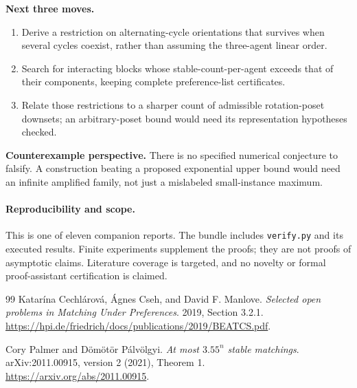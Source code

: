 \documentclass[11pt,a4paper]{article}
\theoremstyle{definition}
\theoremstyle{remark}
\begin{document}
\textbf{Next three moves.}
\begin{enumerate}[nosep]
\item Derive a restriction on alternating-cycle orientations that survives when
several cycles coexist, rather than assuming the three-agent linear order.
\item Search for interacting blocks whose stable-count-per-agent exceeds that
of their components, keeping complete preference-list certificates.
\item Relate those restrictions to a sharper count of admissible rotation-poset
downsets; an arbitrary-poset bound would need its representation hypotheses checked.
\end{enumerate}
\textbf{Counterexample perspective.} There is no specified numerical conjecture to
falsify. A construction beating a proposed exponential upper bound would need
an infinite amplified family, not just a mislabeled small-instance maximum.

\paragraph{Reproducibility and scope.} This is one of eleven companion reports. The bundle includes \texttt{verify.py} and its executed results. Finite experiments supplement the proofs; they are not proofs of asymptotic claims. Literature coverage is targeted, and no novelty or formal proof-assistant certification is claimed.

\begin{thebibliography}{99}
\small
{}
Katar\'ina Cechl\'arov\'a, \'Agnes Cseh, and David F. Manlove.
\emph{Selected open problems in Matching Under Preferences}. 2019, Section 3.2.1.
\url{https://hpi.de/friedrich/docs/publications/2019/BEATCS.pdf}.

Cory Palmer and D\"om\"ot\"or P\'alv\"olgyi.
\emph{At most $3.55^n$ stable matchings}. arXiv:2011.00915, version 2 (2021), Theorem 1.
\url{https://arxiv.org/abs/2011.00915}.

\end{thebibliography}
\end{document}
